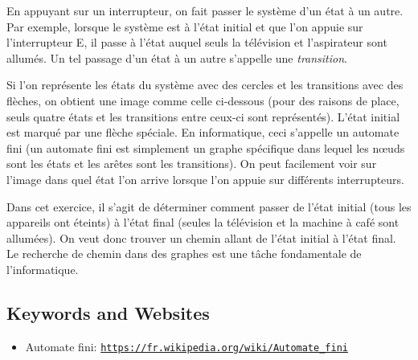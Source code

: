 \documentclass[a4paper,11pt]{report}
\newcommand{\BrochureUrlText}[1]{\texttt{#1}}
\newcommand{\taskGraphicsFolder}{..}
\begin{document}
En appuyant sur un interrupteur, on fait passer le système d’un état à un autre. Par exemple, lorsque le système est à l’état initial et que l’on appuie sur l’interrupteur E, il passe à l’état auquel seuls la télévision et l’aspirateur sont allumés. Un tel passage d’un état à un autre s’appelle une \emph{transition}.

Si l’on représente les états du système avec des cercles et les transitions avec des flèches, on obtient une image comme celle ci-dessous (pour des raisons de place, seuls quatre états et les transitions entre ceux-ci sont représentés). L’état initial est marqué par une flèche spéciale. En informatique, ceci s’appelle un automate fini (un automate fini est simplement un graphe spécifique dans lequel les nœuds sont les états et les arêtes sont les transitions). On peut facilement voir sur l’image dans quel état l’on arrive lorsque l’on appuie sur différents interrupteurs.

{\centering%
\par}

Dans cet exercice, il s’agit de déterminer comment passer de l’état initial (tous les appareils ont éteints) à l’état final (seules la télévision et la machine à café sont allumées). On veut donc trouver un chemin allant de l’état initial à l’état final. Le recherche de chemin dans des graphes est une tâche fondamentale de l’informatique.

{\raggedright

\subsection*{Keywords and Websites}

\begin{itemize}
  \item Automate fini: \href{https://fr.wikipedia.org/wiki/Automate_fini}{\BrochureUrlText{https://fr.wikipedia.org/wiki/Automate\_fini}}
\end{itemize}


}
\end{document}
